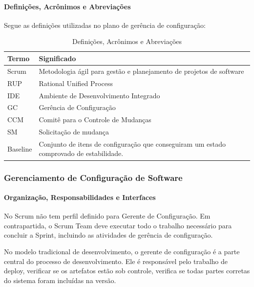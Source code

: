 \paragraph{Definições, Acrônimos e Abreviações}

Segue as definições utilizadas no plano de gerência de configuração:

\begin{table}[H]
      \begin{center}
        \begin{tabular}{| l | l |}
        \hline
        \textbf{Termo} & \textbf{Significado} \\ \hline
        Scrum & Metodologia ágil para gestão e planejamento de projetos de software \\ \hline
        RUP & Rational Unified Process \\ \hline
        IDE & Ambiente de Desenvolvimento Integrado \\ \hline
        GC & Gerência de Configuração \\ \hline
        CCM & Comitê para o Controle de Mudanças \\ \hline
        SM & Solicitação de mudança \\ \hline
        Baseline & Conjunto de itens de configuração que conseguiram um estado comprovado de estabilidade. \\ \hline
        \end{tabular}
      \end{center}
    \caption{Definições, Acrônimos e Abreviações}
    \end{table}

\subsubsection{Gerenciamento de Configuração de Software}

\paragraph{Organização, Responsabilidades e Interfaces} 

No Scrum não tem perfil definido para Gerente de Configuração. Em contrapartida, o Scrum Team deve executar todo o trabalho necessário para concluir a Sprint, incluindo as atividades de gerência de configuração.

No modelo tradicional de desenvolvimento, o gerente de configuração é a parte central do processo de desenvolvimento. Ele é responsável pelo trabalho de deploy, verificar se os artefatos estão sob controle, verifica se todas partes corretas do sistema foram incluídas na versão.

